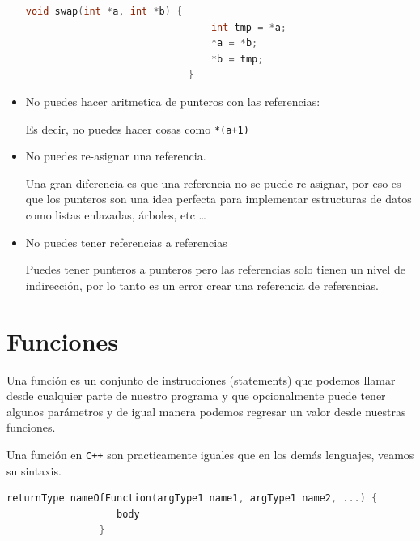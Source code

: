 \documentclass[12pt, fleqn]{report}                             %
\theoremstyle{break}                                            %
\newcommand{\textCode}[1]  { \texttt{#1} }                      %
\newcommand \Cpp  {\textCode{C++} }                               %
\begin{document}
\begin{itemize}
\begin{lstlisting}[language=C++, gobble=28]
                            void swap(int *a, int *b) {
                                int tmp = *a;
                                *a = *b;
                                *b = tmp;
                            }

                        \end{lstlisting}

                    \item No puedes hacer aritmetica de punteros con las referencias:

                        Es decir, no puedes hacer cosas como \textCode{*(a+1)}

                    \item No puedes re-asignar una referencia.

                        Una gran diferencia es que una referencia no se puede re asignar, por eso
                        es que los punteros son una idea perfecta para implementar estructuras de datos
                        como listas enlazadas, árboles, etc \dots

                    \item No puedes tener referencias a referencias
                    
                        Puedes tener punteros a punteros pero las referencias solo tienen un nivel de indirección,
                        por lo tanto es un error crear una referencia de referencias.
                \end{itemize}


  

        \clearpage
        \section{Funciones}

            Una función es un conjunto de instrucciones (statements) que podemos llamar desde cualquier
            parte de nuestro programa y que opcionalmente puede tener algunos parámetros y de igual
            manera podemos regresar un valor desde nuestras funciones. 

            Una función en \Cpp son practicamente iguales que en los demás lenguajes, veamos su sintaxis.
            \begin{lstlisting}[language=C++, gobble=16]
                returnType nameOfFunction(argType1 name1, argType1 name2, ...) {
                   body
                }
            \end{lstlisting}
\end{document}
